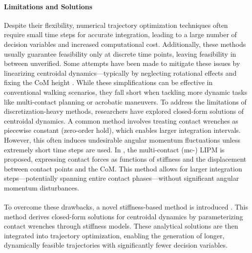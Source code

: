 \documentclass[main.tex]{subfiles}
\begin{document}
\begin{sloppypar}
\paragraph{Limitations and Solutions} Despite their flexibility, numerical trajectory optimization techniques often require small time steps for accurate integration, leading to a large number of decision variables and increased computational cost. Additionally, these methods usually guarantee feasibility only at discrete time points, leaving feasibility in between unverified. Some attempts have been made to mitigate these issues by linearizing centroidal dynamics—typically by neglecting rotational effects and fixing the CoM height \cite{audren2014model}. While these simplifications can be effective in conventional walking scenarios, they fall short when tackling more dynamic tasks like multi-contact planning or acrobatic maneuvers. To address the limitations of discretization-heavy methods, researchers have explored closed-form solutions of centroidal dynamics. A common method involves treating contact wrenches as piecewise constant (zero-order hold), which enables larger integration intervals. However, this often induces undesirable angular momentum fluctuations unless extremely short time steps are used. In \cite{tazaki2022fast}, the multi-contact (mc-) LIPM is proposed, expressing contact forces as functions of stiffness and the displacement between contact points and the CoM. This method allows for larger integration steps—potentially spanning entire contact phases—without significant angular momentum disturbances. \\
\\
To overcome these drawbacks, a novel stiffness-based method is introduced \cite{tazaki2024trajectory}. This method derives closed-form solutions for centroidal dynamics by parameterizing contact wrenches through stiffness models. These analytical solutions are then integrated into trajectory optimization, enabling the generation of longer, dynamically feasible trajectories with significantly fewer decision variables.
\end{sloppypar}





\end{document}

